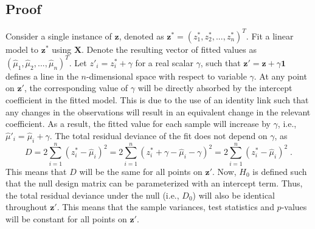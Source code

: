 \documentclass{article}
\newcommand{\nsamples}{n}
\newcommand{\sample}{i}
\newcommand{\normean}{\mu}
\newcommand\design{\mathbf{X}}
\newcommand{\nullhypo}[1]{H_{0#1}}
\newcommand\deviance{D}
\newcommand{\modifier}{\gamma}
\newcommand{\logcount}{z}
\newcommand{\oriobs}[0]{\mathbf{\logcount}}
\newcommand{\modobs}[0]{\mathbf{\logcount}'}
\newcommand{\instance}[0]{\mathbf{\logcount}^*}
\newcommand{\allones}[0]{\mathbf{1}}
\begin{document}
\subsection{Proof}
\label{sec:single_filter_proof}
Consider a single instance of $\oriobs$, denoted as $\instance = (\logcount^*_1, \logcount^*_2, ..., \logcount^*_\nsamples)^T$. 
Fit a linear model to $\instance$ using $\design$. 
Denote the resulting vector of fitted values as $(\hat\normean_1, \hat\normean_2, ..., \hat\normean_\nsamples)^T$.
Let $\logcount'_\sample = \logcount^*_\sample + \modifier$ for a real scalar $\modifier$, such that $\modobs= \oriobs+\modifier\allones$ defines a line in the $\nsamples$-dimensional space with respect to variable $\modifier$.
At any point on $\modobs$, the corresponding value of $\modifier$ will be directly absorbed by the intercept coefficient in the fitted model.  
This is due to the use of an identity link such that any changes in the observations will result in an equivalent change in the relevant coefficient.
As a result, the fitted value for each sample will increase by $\modifier$, i.e., $\hat\normean'_\sample = \hat\normean_\sample + \modifier$.  
The total residual deviance of the fit does not depend on $\modifier$, as 
\[
\deviance = 2 \sum_{\sample=1}^\nsamples ( \logcount^*_\sample - \hat\normean_\sample)^2
= 2 \sum_{\sample=1}^\nsamples ( \logcount^*_\sample + \modifier - \hat\normean_\sample - \modifier)^2
= 2 \sum_{\sample=1}^\nsamples ( \logcount^*_\sample - \hat\normean_\sample)^2 \;.
\]
This means that $\deviance$ will be the same for all points on $\modobs$.  
Now, $\nullhypo{}$ is defined such that the null design matrix can be parameterized with an intercept term.
Thus, the total residual deviance under the null (i.e., $\deviance_0$) will also be identical throughout $\modobs$.
This means that the sample variances, test statistics and $p$-values will be constant for all points on $\modobs$.

\end{document}
